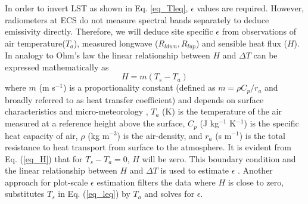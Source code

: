 \documentclass[fleqn,10pt]{wlscirep}
\begin{document}
In order to invert LST as shown in Eq. \eqref{eq_Tleq}, $\epsilon$ values are required. However, radiometers at ECS do not measure spectral bands separately to deduce emissivity directly. Therefore, we will deduce site specific $\epsilon$ from observations of air temperature($T_a$), measured longwave ($R_{ldwn},R_{lup}$) and sensible heat flux ($H$)\cite{holmes2016cloud}. In analogy to Ohm's law the linear relationship between $H$ and $\Delta T$ can be expressed mathematically as
\begin{equation}\label{eq_H}
H= m(T_{s} - T_{a})
\end{equation}
where  $m$ (m s$^{-1}$) is a proportionality constant (defined as $m=\rho C_{p}/r_{a}$ and broadly referred to as heat transfer coefficient) and depends on surface characteristics and micro-meteorology \cite{lhomme1988radiative}, $T_{a}$ (K) is the temperature of the air measured at a reference height above the surface, $C_{p}$ (J kg$^{-1}$ K$^{-1}$) is the specific heat capacity of air, $\rho$ (kg m$^{-3}$) is the air-density, and $r_{a}$ (s m$^{-1}$) is the total resistance to heat transport from surface to the atmosphere. It is evident from Eq. (\ref{eq_H}) that for $T_{s} - T_{a} = 0$, $H$ will be zero. This boundary condition and the linear relationship  between $H$ and $\Delta T $ is used to estimate $\epsilon$ \cite{holmes2009land,holmes2016cloud}. Another approach for plot-scale $\epsilon$ estimation filters the data where $H$ is close to zero, substitutes $T_{s}$ in Eq. (\ref{eq_leq}) by $T_{a}$ and solves for $\epsilon$\cite{maes2019potential}. 
\end{document}
